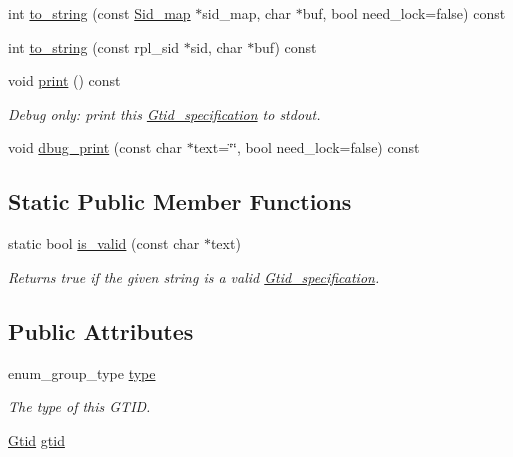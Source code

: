 \begin{DoxyCompactItemize}
\item 
int \mbox{\hyperlink{structGtid__specification_a9bad0bb6fe5496f470066cac0cf85d70}{to\+\_\+string}} (const \mbox{\hyperlink{classSid__map}{Sid\+\_\+map}} $\ast$sid\+\_\+map, char $\ast$buf, bool need\+\_\+lock=false) const
\item 
int \mbox{\hyperlink{structGtid__specification_a35657ab3ee83093748bd18255836f745}{to\+\_\+string}} (const rpl\+\_\+sid $\ast$sid, char $\ast$buf) const
\item 
\mbox{\label{structGtid__specification_aee2efc4ab80fc8bce8ffb626e905bd30}} 
void \mbox{\hyperlink{structGtid__specification_aee2efc4ab80fc8bce8ffb626e905bd30}{print}} () const
\begin{DoxyCompactList}\small\item\em Debug only\+: print this \mbox{\hyperlink{structGtid__specification}{Gtid\+\_\+specification}} to stdout. \end{DoxyCompactList}\item 
void \mbox{\hyperlink{structGtid__specification_aa8cc13996505c7b3521f139aa9296f92}{dbug\+\_\+print}} (const char $\ast$text=\char`\"{}\char`\"{}, bool need\+\_\+lock=false) const
\end{DoxyCompactItemize}
\subsection*{Static Public Member Functions}
\begin{DoxyCompactItemize}
\item 
\mbox{\label{structGtid__specification_a3921c32700786867d612b5508154e5c0}} 
static bool \mbox{\hyperlink{structGtid__specification_a3921c32700786867d612b5508154e5c0}{is\+\_\+valid}} (const char $\ast$text)
\begin{DoxyCompactList}\small\item\em Returns true if the given string is a valid \mbox{\hyperlink{structGtid__specification}{Gtid\+\_\+specification}}. \end{DoxyCompactList}\end{DoxyCompactItemize}
\subsection*{Public Attributes}
\begin{DoxyCompactItemize}
\item 
\mbox{\label{structGtid__specification_af11164fbc8f7894da68f5890082bef43}} 
enum\+\_\+group\+\_\+type \mbox{\hyperlink{structGtid__specification_af11164fbc8f7894da68f5890082bef43}{type}}
\begin{DoxyCompactList}\small\item\em The type of this G\+T\+ID. \end{DoxyCompactList}\item 
\mbox{\hyperlink{structGtid}{Gtid}} \mbox{\hyperlink{structGtid__specification_a4f1f94ceca9d1f0088a929df35c89c01}{gtid}}
\end{DoxyCompactItemize}
